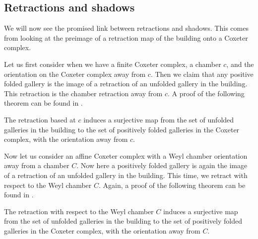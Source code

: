 \documentclass[11pt]{article}
\begin{document}
\subsection{Retractions and shadows}\label{retract}

We will now see the promised link between retractions and shadows. This comes from looking at the preimage of a retraction map of the building onto a Coxeter complex. 




    



Let us first consider when we have a finite Coxeter complex, a chamber $c$, and the orientation on the Coxeter complex away from $c$. Then we claim that any positive folded gallery is the image of a retraction of an unfolded gallery in the building. This retraction is the chamber retraction away from $c$. A proof of the following theorem can be found in \cite{LSGAL}.

\begin{theorem}
    The retraction based at $c$ induces a surjective map from the set of unfolded galleries in the building to the set of positively folded galleries in the Coxeter complex, with the orientation away from $c$.
\end{theorem}


Now let us consider an affine Coxeter complex with a Weyl chamber orientation away from a chamber $C$. Now here a positively folded gallery is again the image of a retraction of an unfolded gallery in the building. This time, we retract with respect to the Weyl chamber $C$. Again, a proof of the following theorem can be found in \cite{LSGAL}.

\begin{theorem}
    The retraction with respect to the Weyl chamber $C$ induces a surjective map from the set of unfolded galleries in the building to the set of positively folded galleries in the Coxeter complex, with the orientation away from $C$. 
\end{theorem}
\end{document}
